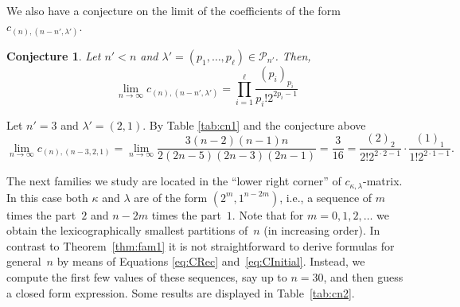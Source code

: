 \documentclass[smallextended]{svjour3}
\newtheorem{conj}[thm]{Conjecture}
\begin{document}
We also have a conjecture on  the limit of the coefficients of the form $c_{(n),(n-n',\lambda')}$.

\begin{conj}
Let $n'<n$ and $\lambda'=(p_1,\ldots,p_\ell)\in\mathcal{P}_{n'}$. Then, 
\[
\lim_{n\to\infty} c_{(n),(n-n',\lambda') }=\prod_{i=1}^{\ell} \frac{(p_i)_{p_i}}{p_i! 2^{2p_i-1}}
\]
\end{conj}

\begin{example}
Let $n'=3$ and $\lambda'=(2,1)$. By Table \ref{tab:cn1} and the conjecture above
\[
\lim_{n\rightarrow\infty}c_{(n),(n-3,2,1)}=\lim_{n\rightarrow\infty}\frac{3(n-2)(n-1)n}{2(2n-5)(2n-3)(2n-1)}=\frac{3}{16}=\frac{(2)_2}{2!2^{2\cdot 2-1}}\cdot\frac{(1)_1}{1!2^{2\cdot 1-1}}.
\]
\end{example}

The next families we study are located in the ``lower right corner'' of
$c_{\kappa,\lambda}$-matrix. In this case both $\kappa$ and $\lambda$ are of
the form $(2^m,1^{n-2m})$, i.e., a sequence of $m$ times the part~$2$ and
$n-2m$ times the part~$1$. Note that for $m=0,1,2,\dots$ we obtain the
lexicographically smallest partitions of~$n$ (in increasing order).  In
contrast to Theorem~\ref{thm:fam1} it is not straightforward to derive
formulas for general~$n$ by means of Equations \eqref{eq:CRec}
and~\eqref{eq:CInitial}. Instead, we compute the first few values of these
sequences, say up to $n=30$, and then guess a closed form expression.
Some results are displayed in Table~\ref{tab:cn2}.
\end{document}
